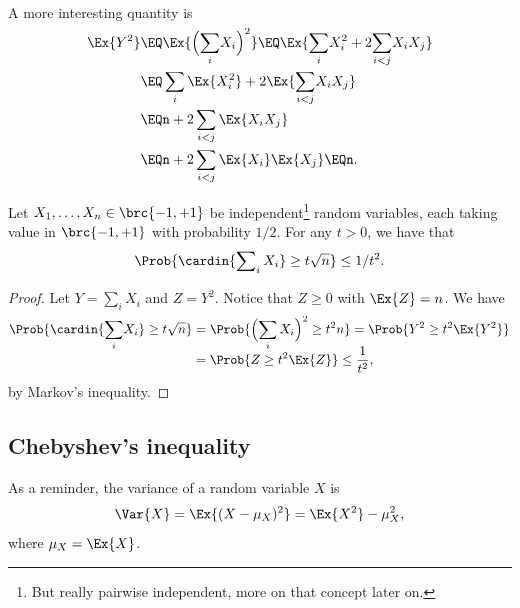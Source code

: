 A more interesting quantity is
\begin{align*}
  \Ex{Y^2} %
  &\EQ%
    \Ex{ \smash{\Bigl(\smash{\sum_i} X_i\Bigr)^2} \Bigr.}%
    \EQ%
    \Ex{\Bigl. \smash{\sum_i} X_i^2 + 2 \smash{\sum_{i < j}} X_i X_j}%
    \\[.2cm]&
    \EQ%
    \sum_i \Ex{  X_i^2} + 2\Ex{  \smash{\sum_{i < j}} X_i X_j \Bigr.}%
    \\&
    \EQ%
    n  + 2 \sum_{i < j} \Ex{ X_i X_j}%
  \\&%
  \EQ%
  n + 2 \sum_{i < j} \Ex{ X_i} \Ex{ X_j}%
  \EQ%
  n.
\end{align*}



\begin{lemma}
    Let $X_1, \ldots, X_n \in \brc{-1,+1}$ be independent\footnote{But really
       pairwise independent, more on that concept later on.}  random
    variables, each taking value in $\brc{-1, +1}$ with probability
    $1/2$. For any $t > 0$, we have that
    \begin{equation*}
        \Prob{ \cardin{\sum\nolimits_i X_i} \geq t \sqrt{n}} \leq 1/t^2.
    \end{equation*}
\end{lemma}

\begin{proof}
    Let $Y= \sum_i X_i$ and $Z =Y^2$. Notice that $Z \geq 0$ with
    $\Ex{Z} = n$.  We have
    \begin{align*}
        \Prob{ \cardin{\Bigl.\smash{\sum_i} X_i} \geq t \sqrt{n}}%
        &=%
        \Prob{ \smash{ \Bigl(\sum_i X_i\Bigr)^2 \geq t^2 n} \Bigr.}%
        =%
        \Prob{ Y^2 \geq t^2 \Ex{Y^2} \Bigr.} %
        \\&=%
        \Prob{ Z \geq t^2 \Ex{Z}} %
        \leq%
        \frac{1}{t^2},
    \end{align*}
    by Markov's inequality.
\end{proof}


\subsection{Chebyshev's inequality}

As a reminder, the variance of a random variable $X$ is
\begin{equation*}
    \Var{ X} = \Ex{ (X -\mu_X)^2 } = \Ex{X^2} - \mu_X^2,
\end{equation*}
where $\mu_X = \Ex{X}$.




